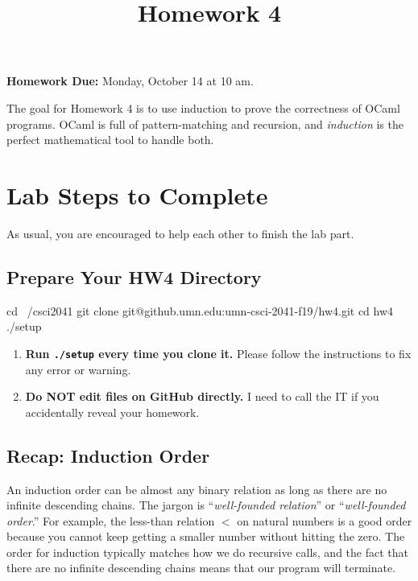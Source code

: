 \documentclass[fleqn]{article}
\title{Homework 4}
\author{}\date{}
\begin{document}
\maketitle

\textbf{Homework Due:} Monday, October 14 at 10 am.

The goal for Homework 4 is to use induction to prove the correctness of
OCaml programs. OCaml is full of pattern-matching and recursion, and
\emph{induction} is the perfect mathematical tool to handle both.

\section{Lab Steps to Complete}

As usual, you are encouraged to help each other to finish the lab part.

\subsection*{Prepare Your HW4 Directory}

\begin{shellcode}
cd ~/csci2041
git clone git@github.umn.edu:umn-csci-2041-f19/hw4.git
cd hw4
./setup
\end{shellcode}

\begin{enumerate}
\item
  \textbf{Run \Verb|./setup| every time you clone it.} Please follow the
  instructions to fix any error or warning.
\item
  \textbf{Do NOT edit files on GitHub directly.} I need to call the IT
  if you accidentally reveal your homework.
\end{enumerate}

\subsection*{Recap: Induction Order}

An induction order can be almost any binary relation as long as there are no infinite descending chains. The jargon is ``\emph{well-founded relation}'' or ``\emph{well-founded order}.'' For example, the less-than relation $<$ on natural numbers is a good order because you cannot keep getting a smaller number without hitting the zero. The order for induction typically matches how we do recursive calls, and the fact that there are no infinite descending chains means that our program will terminate.
\end{document}
